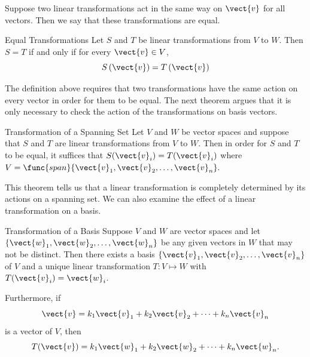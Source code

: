 Suppose two linear transformations act in the same way on $\vect{v}$ for all vectors. Then we say that these transformations are equal.

\begin{definition}{Equal Transformations}\label{def:equaltransformations}
Let $S$ and $T$ be linear transformations from $V$ to $W$. Then $S = T$ if and only if for every $\vect{v} \in V$, 
\[
S \left( \vect{v} \right) = T \left( \vect{v} \right)
\]
\end{definition}

The definition above requires that two transformations have the same action on every vector in order for them to be equal. The next theorem argues that it is only necessary to check the action of the transformations on basis vectors.

\begin{theorem}{Transformation of a Spanning Set}\label{thm:transformationspanningset}
Let $V$ and $W$ be vector spaces and suppose that $S$ and $T$ are linear transformations from $V$ to $W$. Then in order for $S$ and $T$ to be equal, it suffices that $S(\vect{v}_i) = T(\vect{v}_i)$ where $V=\func{span} \{ \vect{v}_1, \vect{v}_2, \ldots, \vect{v}_n\}.$
\end{theorem}

This theorem tells us that a linear transformation is completely
determined by its actions on a spanning set. We can also examine the effect of a linear transformation on a basis.

\begin{theorem}{Transformation of a Basis}\label{thm:transformationbasis}
Suppose $V$ and $W$ are vector spaces and let $\{ \vect{w}_1, \vect{w}_2, \ldots, \vect{w}_n\}$ be any given vectors in $W$ that may not be distinct. Then there exists a basis $\{ \vect{v}_1, \vect{v}_2, \ldots, \vect{v}_n\}$ of $V$ and a unique linear transformation $T: V \mapsto W$ with $T (\vect{v}_i) = \vect{w}_i$.

Furthermore, if 
\[ \vect{v} = k_1\vect{v}_1+k_2\vect{v}_2+ \cdots+ k_n\vect{v}_n\]
is a vector of $V$, then
\[ T(\vect{v}) = k_1\vect{w}_1+k_2\vect{w}_2+ \cdots+ k_n\vect{w}_n.\]
\end{theorem}